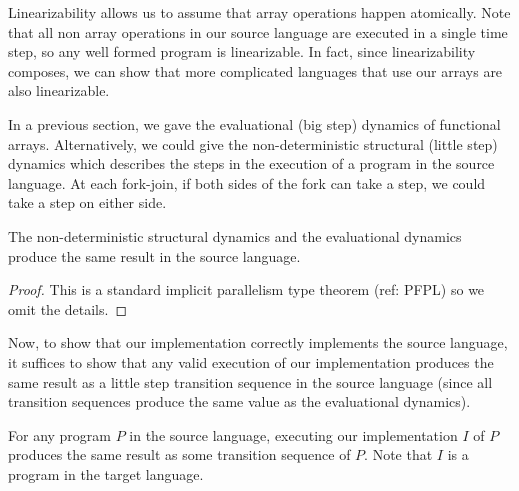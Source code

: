 \documentclass[preprint]{sigplanconf}
\begin{document}
Linearizability allows us to assume that array operations happen atomically. Note that all non array operations in our source language are executed in a single time step, so any well formed program is linearizable. In fact, since linearizability composes, we can show that more complicated languages that use our arrays are also linearizable.

In a previous section, we gave the evaluational (big step) dynamics of functional arrays. Alternatively, we could give the non-deterministic structural (little step) dynamics which describes the steps in the execution of a program in the source language. At each fork-join, if both sides of the fork can take a step, we could take a step on either side.

\begin{theorem}
The non-deterministic structural dynamics and the evaluational dynamics produce the same result in the source language.
\end{theorem}

\begin{proof}
This is a standard implicit parallelism type theorem (ref: PFPL) so we omit the details.
\end{proof}

Now, to show that our implementation correctly implements the source language, it suffices to show that any valid execution of our implementation produces the same result as a little step transition sequence in the source language (since all transition sequences produce the same value as the evaluational dynamics).
 
\begin{theorem}
For any program $P$ in the source language, executing our implementation $I$ of $P$ produces the same result as some transition sequence of $P$. Note that $I$ is a program in the target language.
\end{theorem}
\end{document}
